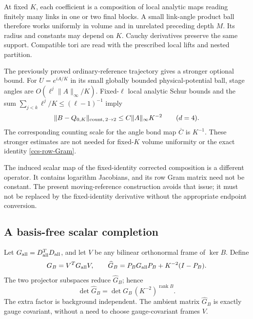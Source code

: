 \documentclass[11pt]{article}
\theoremstyle{remark}
\begin{document}
At fixed \(K\), each coefficient is a composition of local
analytic maps reading finitely many links in one or two final
blocks. A small link-angle product ball therefore works uniformly
in volume and in unrelated preceding depth \(M\).
Its radius and constants may depend on \(K\).
Cauchy derivatives preserve the same support. Compatible tori
are read with the prescribed local lifts and nested partition.

The previously proved ordinary-reference trajectory gives a
stronger optional bound. For \(U=e^{iA/K}\) in its small globally
bounded physical-potential ball, stage angles are
\(O(\ell^j\|A\|_\infty/K)\). Fixed-\(\ell\) local analytic
Schur bounds and the sum
\(\sum_{j<k}\ell^j/K\le(\ell-1)^{-1}\) imply
\begin{equation}
 \|B-Q_{0,K}\|_{{\rm count},\,2\to2}
                    \le C\|A\|_\infty K^{-2}
                    \qquad(d=4).
 \label{ccs-physical-smallness}
\end{equation}
The corresponding counting scale for the angle bond map
\(\overline C\) is \(K^{-1}\).
These stronger estimates are not needed for fixed-\(K\)
volume uniformity or the exact identity
\eqref{ccs-row-Gram}.

The induced scalar map of the fixed-identity corrected
composition is a different operator. It contains logarithm
Jacobians, and its row Gram matrix need not be constant.
The present moving-reference construction avoids that issue;
it must not be replaced by the fixed-identity derivative
without the appropriate endpoint conversion.

\subsection{A basis-free scalar completion}
\label{ccs-completion-section}

Let \(G_{\rm all}=D_{\rm all}^TD_{\rm all}\), and let \(V\)
be any bilinear orthonormal frame of \(\ker B\). Define
\begin{equation}
 G_B=V^TG_{\rm all}V,\qquad
 \widehat G_B=P_BG_{\rm all}P_B+K^{-2}(I-P_B).
 \label{ccs-completion}
\end{equation}
The two projector subspaces reduce \(\widehat G_B\); hence
\begin{equation}
       \det\widehat G_B=\det G_B\,
                        (K^{-2})^{\operatorname{rank}B}.
 \label{ccs-completion-determinant}
\end{equation}
The extra factor is background independent.
The ambient matrix \(\widehat G_B\) is exactly gauge covariant,
without a need to choose gauge-covariant frames \(V\).
\end{document}
